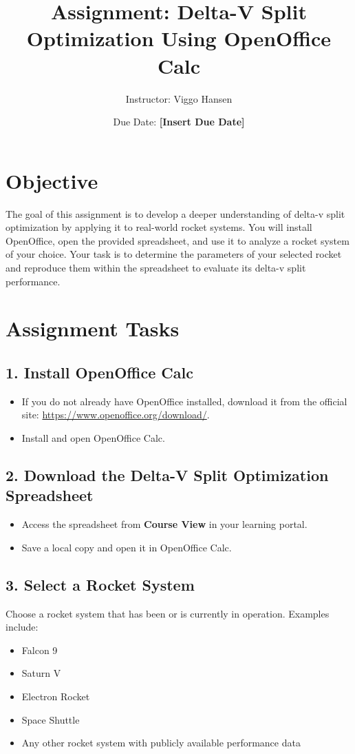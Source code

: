 \documentclass[a4paper,12pt]{article}
\title{Assignment: Delta-V Split Optimization Using OpenOffice Calc}
\author{Instructor: Viggo Hansen}
\date{Due Date: \textbf{[Insert Due Date]}}
\begin{document}
\maketitle

\section{Objective}
The goal of this assignment is to develop a deeper understanding of delta-v split optimization by applying it to real-world rocket systems. You will install OpenOffice, open the provided spreadsheet, and use it to analyze a rocket system of your choice. Your task is to determine the parameters of your selected rocket and reproduce them within the spreadsheet to evaluate its delta-v split performance.

\section{Assignment Tasks}

\subsection{1. Install OpenOffice Calc}
\begin{itemize}
    \item If you do not already have OpenOffice installed, download it from the official site: 
    \url{https://www.openoffice.org/download/}.
    \item Install and open OpenOffice Calc.
\end{itemize}

\subsection{2. Download the Delta-V Split Optimization Spreadsheet}
\begin{itemize}
    \item Access the spreadsheet from \textbf{Course View} in your learning portal.
    \item Save a local copy and open it in OpenOffice Calc.
\end{itemize}

\subsection{3. Select a Rocket System}
Choose a rocket system that has been or is currently in operation. Examples include:
\begin{itemize}
    \item Falcon 9
    \item Saturn V
    \item Electron Rocket
    \item Space Shuttle
    \item Any other rocket system with publicly available performance data
\end{itemize}
\end{document}
